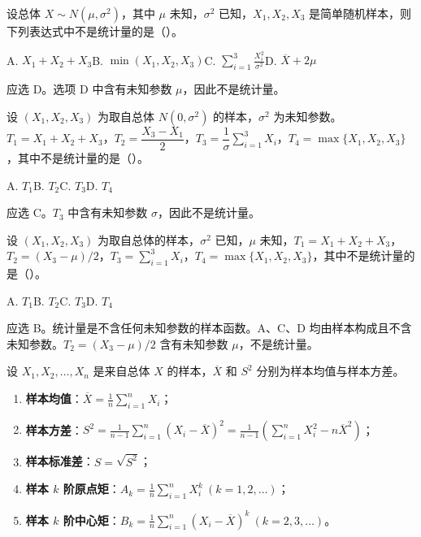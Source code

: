 \documentclass[lang=cn,11pt]{elegantbook}
\begin{document}
\begin{exercise}\label{exer:6-statistic-judge}
设总体 \(X \sim N(\mu, \sigma^2)\)，其中 \(\mu\) 未知，\(\sigma^2\) 已知，\(X_1, X_2, X_3\) 是简单随机样本，则下列表达式中不是统计量的是（\quad）。\par
A. \(X_1 + X_2 + X_3\)\qquad B. \(\min(X_1, X_2, X_3)\)\qquad C. \(\displaystyle\sum_{i=1}^{3}\frac{X_i^2}{\sigma^2}\)\qquad D. \(\overline{X} + 2\mu\)
\end{exercise}

\begin{solution}
应选 D。选项 D 中含有未知参数 \(\mu\)，因此不是统计量。
\end{solution}

\begin{exercise}\label{exer:6-statistic-sigma}
设 \((X_1, X_2, X_3)\) 为取自总体 \(N(0, \sigma^2)\) 的样本，\(\sigma^2\) 为未知参数。\(T_1 = X_1+X_2+X_3\)，\(T_2 = \dfrac{X_3 - X_1}{2}\)，\(T_3 = \dfrac{1}{\sigma}\sum_{i=1}^{3}X_i\)，\(T_4 = \max\{X_1, X_2, X_3\}\)，其中不是统计量的是（\quad）。\par
A. \(T_1\)\qquad B. \(T_2\)\qquad C. \(T_3\)\qquad D. \(T_4\)
\end{exercise}
\begin{solution}
应选 C。\(T_3\) 中含有未知参数 \(\sigma\)，因此不是统计量。
\end{solution}

\begin{exercise}\label{exer:6-stat-mu}
设 \((X_1, X_2, X_3)\) 为取自总体的样本，\(\sigma^2\) 已知，\(\mu\) 未知，\(T_1=X_1+X_2+X_3\)，\(T_2=(X_3-\mu)/2\)，\(T_3=\sum_{i=1}^{3}X_i\)，\(T_4=\max\{X_1,X_2,X_3\}\)，其中不是统计量的是（\quad）。\par
A. \(T_1\)\quad B. \(T_2\)\quad C. \(T_3\)\quad D. \(T_4\)
\end{exercise}
\begin{solution}
应选 B。统计量是不含任何未知参数的样本函数。A、C、D 均由样本构成且不含未知参数。\(T_2=(X_3-\mu)/2\) 含有未知参数 \(\mu\)，不是统计量。
\end{solution}


\begin{definition}[常用统计量] \label{def:common-stat}
设 \(X_1, X_2, \dots, X_n\) 是来自总体 \(X\) 的样本，\(\overline{X}\) 和 \(S^2\) 分别为样本均值与样本方差。
\begin{enumerate}
    \item \textbf{样本均值}：\(\displaystyle\overline{X} = \frac{1}{n}\sum_{i=1}^{n}X_i\)；
    \item \textbf{样本方差}：\(\displaystyle S^2 = \frac{1}{n-1}\sum_{i=1}^{n}(X_i - \overline{X})^2 = \frac{1}{n-1}\!\left(\sum_{i=1}^{n}X_i^2 - n\overline{X}^2\right)\)；
    \item \textbf{样本标准差}：\(S = \sqrt{S^2}\)；
    \item \textbf{样本 \(k\) 阶原点矩}：\(\displaystyle A_k = \frac{1}{n}\sum_{i=1}^{n}X_i^k\ (k=1,2,\dots)\)；
    \item \textbf{样本 \(k\) 阶中心矩}：\(\displaystyle B_k = \frac{1}{n}\sum_{i=1}^{n}(X_i - \overline{X})^k\ (k=2,3,\dots)\)。
\end{enumerate}
\end{definition}
\end{document}
